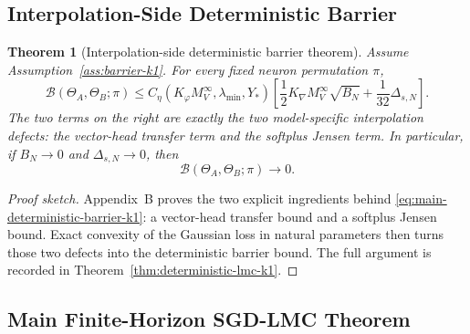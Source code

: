 \documentclass[11pt]{article}
\newtheorem{theorem}{Theorem}
\theoremstyle{definition}
\newcommand{\cB}{\mathcal{B}}
\begin{document}
\subsection{Interpolation-Side Deterministic Barrier}

\begin{theorem}[Interpolation-side deterministic barrier theorem]
\label{thm:main-barrier-k1}
Assume Assumption~\ref{ass:barrier-k1}. For every fixed neuron permutation $\pi$,
\begin{equation}
  \cB(\Theta_A,\Theta_B;\pi)
  \le
  C_\eta(K_\varphi M_V^\infty,\lambda_{\min},Y_\ast)
  \left[
    \frac12 K_{\nabla}M_V^\infty\sqrt{B_N}
    +
    \frac1{32}\Delta_{s,N}
  \right].
  \label{eq:main-deterministic-barrier-k1}
\end{equation}
The two terms on the right are exactly the two model-specific interpolation
defects: the vector-head transfer term and the softplus Jensen term. In
particular, if $B_N\to 0$ and $\Delta_{s,N}\to 0$, then
\[
  \cB(\Theta_A,\Theta_B;\pi)\to 0.
\]
\end{theorem}

\begin{proof}[Proof sketch]
Appendix~B proves the two explicit ingredients behind
\eqref{eq:main-deterministic-barrier-k1}: a vector-head transfer bound and a
softplus Jensen bound. Exact convexity of the Gaussian loss in natural
parameters then turns those two defects into the deterministic barrier bound.
The full argument is recorded in Theorem~\ref{thm:deterministic-lmc-k1}.
\end{proof}

\subsection{Main Finite-Horizon SGD-LMC Theorem}
\end{document}
